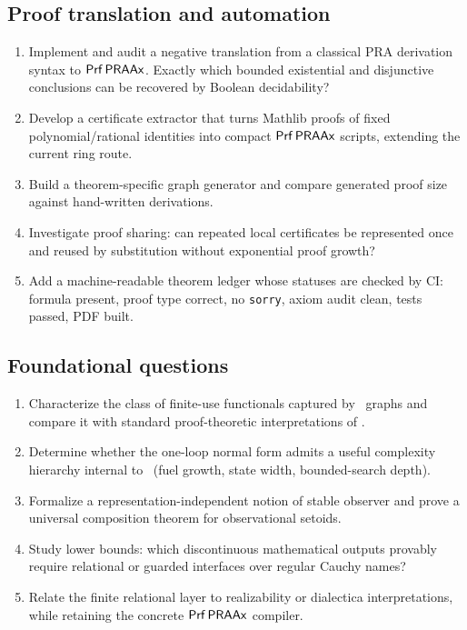 \subsection{Proof translation and automation}

\begin{enumerate}[label=\textbf{R\arabic*.},resume]
  \item Implement and audit a negative translation from a classical PRA derivation syntax to \(\mathsf{Prf}\,\mathsf{PRAAx}\).  Exactly which bounded existential and disjunctive conclusions can be recovered by Boolean decidability?
  \item Develop a certificate extractor that turns Mathlib proofs of fixed polynomial/rational identities into compact \(\mathsf{Prf}\,\mathsf{PRAAx}\) scripts, extending the current ring route.
  \item Build a theorem-specific graph generator and compare generated proof size against hand-written derivations.
  \item Investigate proof sharing: can repeated local certificates be represented once and reused by substitution without exponential proof growth?
  \item Add a machine-readable theorem ledger whose statuses are checked by CI: formula present, proof type correct, no \texttt{sorry}, axiom audit clean, tests passed, PDF built.
\end{enumerate}

\subsection{Foundational questions}

\begin{enumerate}[label=\textbf{R\arabic*.},resume]
  \item Characterize the class of finite-use functionals captured by \KIFC\ graphs and compare it with standard proof-theoretic interpretations of \iPRA.
  \item Determine whether the one-loop normal form admits a useful complexity hierarchy internal to \iPRA\ (fuel growth, state width, bounded-search depth).
  \item Formalize a representation-independent notion of stable observer and prove a universal composition theorem for observational setoids.
  \item Study lower bounds: which discontinuous mathematical outputs provably require relational or guarded interfaces over regular Cauchy names?
  \item Relate the finite relational layer to realizability or dialectica interpretations, while retaining the concrete \(\mathsf{Prf}\,\mathsf{PRAAx}\) compiler.
\end{enumerate}

